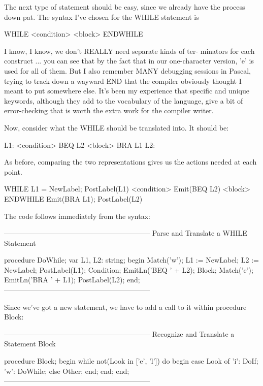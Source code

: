 \documentclass[float=false, crop=false]{standalone}
\begin{document}
The next type of statement should be easy, since we already have the process
down pat. The syntax I've chosen for the WHILE statement is


          WHILE <condition> <block> ENDWHILE


I know, I know, we don't REALLY need separate kinds of ter- minators for each
construct ... you can see that by the fact that in our one-character version,
'e' is used for all of them. But I also remember MANY debugging sessions in
Pascal, trying to track down a wayward END that the compiler obviously thought I
meant to put somewhere else. It's been my experience that specific and unique
keywords, although they add to the vocabulary of the language, give a bit of
error-checking that is worth the extra work for the compiler writer.

Now, consider what the WHILE should be translated into. It should be:


     L1:  <condition>
          BEQ L2
          <block>
          BRA L1
     L2:

As before, comparing the two representations gives us the actions needed at each
point.


     WHILE          { L1 = NewLabel;
                      PostLabel(L1) }
     <condition>    { Emit(BEQ L2) }
     <block>
     ENDWHILE       { Emit(BRA L1);
                      PostLabel(L2) }


The code follows immediately from the syntax:

\begin{code}
{--------------------------------------------------------------}
{ Parse and Translate a WHILE Statement }

procedure DoWhile;
var L1, L2: string;
begin
   Match('w');
   L1 := NewLabel;
   L2 := NewLabel;
   PostLabel(L1);
   Condition;
   EmitLn('BEQ ' + L2);
   Block;
   Match('e');
   EmitLn('BRA ' + L1);
   PostLabel(L2);
end;
{--------------------------------------------------------------}
\end{code}

Since we've got a new statement, we have to add a call to it within procedure
Block:

\begin{code}
{--------------------------------------------------------------}
{ Recognize and Translate a Statement Block }

procedure Block;
begin
   while not(Look in ['e', 'l']) do begin
      case Look of
       'i': DoIf;
       'w': DoWhile;
       else Other;
      end;
   end;
end;
{--------------------------------------------------------------}
\end{code}
\end{document}
